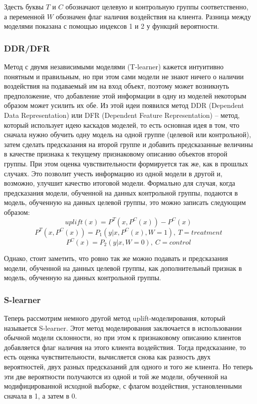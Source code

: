 Здесть буквы $T$ и $C$ обозначают целевую и контрольную группы соответственно, а переменной $W$ обозначен флаг наличия воздействия на клиента. Разница между моделями показана с помощью индексов 1 и 2 у функций вероятности.

\subsubsection*{DDR/DFR}

Метод с двумя независимыми моделями (T-learner) кажется интуитивно понятным и правильным, но при этом сами модели не знают ничего о наличии воздействия на подаваемый им на вход объект, поэтому может возникнуть предположение, что добавление этой информации в одну из моделей некоторым образом может усилить их обе. Из этой идеи появился метод DDR (Dependent Data Representation) или DFR (Dependent Feature Representation) -- метод, который использует идею каскадов моделей, то есть основная идея в том, что сначала нужно обучить одну модель на одной группе (целевой или контрольной), затем сделать предсказания на второй группе и добавить предсказанные величины в качестве признака к текущему признаковому описанию объектов второй группы. При этом оценка чувствительности формируется так же, как в прошлых случаях. Это позволит учесть информацию из одной модели в другой и, возможно, улучшит качество итоговой модели. Формально для случая, когда предсказания модели, обученной на данных контрольной группы, подаются в модель, обученную на данных целевой группы, это можно записать следующим образом:
$$
    uplift(x) = P^T(x, P^C(x)) - P^C(x)
$$
$$
    P^T(x, P^C(x)) = P_1(y | x, P^C(x), W = 1), \: T = treatment
$$
$$
    P^C(x) = P_2(y | x, W = 0), \: C = control
$$

Однако, стоит заметить, что ровно так же можно подавать и предсказания модели, обученной на данных целевой группы, как дополнительный признак в модель, обученную на данных контрольной группы.

\subsubsection*{S-learner}

Теперь рассмотрим немного другой метод uplift-моделирования, который называется S-learner. Этот метод моделирования заключается в использовании обычной модели склонности, но при этом к признаковому описанию клиентов добавляется флаг наличия на этого клиента воздействия. Тогда предсказание, то есть оценка чувствительности, вычисляется снова как разность двух вероятностей, двух разных предсказаний для одного и того же клиента. Но теперь эти две вероятности получаются из одной и той же модели, обученной на модифицированной исходной выборке, с флагом воздействия, установленными сначала в 1, а затем в 0.

